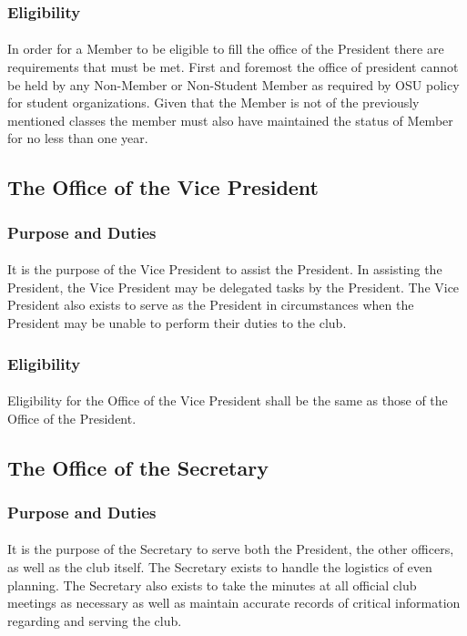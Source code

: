 \documentclass[12pt]{article}
\begin{document}
\subsubsection{Eligibility}
\paragraph{}
In order for a Member to be eligible to fill the office of the President there are requirements that must be met. First and foremost the office of president cannot be held by any Non-Member or Non-Student Member as required by OSU policy for student organizations. Given that the Member is not of the previously mentioned classes the member must also have maintained the status of Member for no less than one year. 

\subsection{The Office of the Vice President}
\subsubsection{Purpose and Duties}
\paragraph{}
It is the purpose of the Vice President to assist the President. In assisting the President, the Vice President may be delegated tasks by the President. The Vice President also exists to serve as the 
President in circumstances when the President may be unable to perform their duties to the club.
\subsubsection{Eligibility}
\paragraph{}
Eligibility for the Office of the Vice President shall be the same as those of the Office of the President.

\subsection{The Office of the Secretary}
\subsubsection{Purpose and Duties}
\paragraph{}
It is the purpose of the Secretary to serve both the President, the other officers, as well as the club itself. The Secretary exists to handle the logistics of even planning. The Secretary also exists
to take the minutes at all official club meetings as necessary as well as maintain accurate records of critical information regarding and serving the club.
\end{document}
